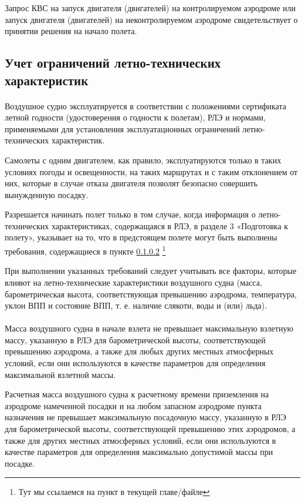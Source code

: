 Запрос КВС на запуск двигателя (двигателей) на контролируемом аэродроме или запуск двигателя (двигателей) на неконтролируемом аэродроме свидетельствует о принятии решения на начало полета.


\subsection{Учет ограничений летно-технических характеристик}


\paragraph{} Воздушное судно эксплуатируется в соответствии с положениями сертификата летной годности (удостоверения о годности к полетам), РЛЭ и нормами, применяемыми для установления эксплуатационных ограничений летно-технических характеристик.	

Самолеты с одним двигателем, как правило, эксплуатируются только в таких условиях погоды и освещенности, на таких маршрутах и с таким отклонением от них, которые в случае отказа двигателя позволят безопасно совершить вынужденную посадку. 

Разрешается начинать полет только в том случае, когда информация о летно-технических характеристиках, содержащаяся в РЛЭ, в разделе 3 «Подготовка к полету», указывает на то, что в предстоящем полете могут быть выполнены требования, содержащиеся в пункте \hyperref[sec:8222]{\ref* {sec:8222}} \footnote{Тут мы ссылаемся на пункт в текущей главе/файле}

При выполнении указанных требований следует учитывать все факторы, которые влияют на летно-технические характеристики воздушного судна (масса, барометрическая высота, соответствующая превышению аэродрома, температура, уклон ВПП и состояние ВПП, т. е. наличие слякоти, воды и (или) льда). 

\paragraph{} \label{sec:8222}Масса воздушного судна в начале взлета не превышает максимальную взлетную массу, указанную в РЛЭ для барометрической высоты, соответствующей превышению аэродрома, а также для любых других местных атмосферных условий, если они используются в качестве параметров для определения максимальной взлетной массы. 

Расчетная масса воздушного судна к расчетному времени приземления на аэродроме намеченной посадки и на любом запасном аэродроме пункта назначения не превышает максимальную посадочную массу, указанную в РЛЭ для барометрической высоты, соответствующей превышению этих аэродромов, а также для других местных атмосферных условий, если они используются в качестве параметров для определения максимально допустимой массы при посадке. 

